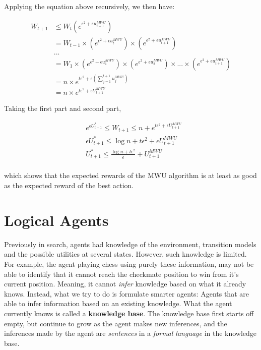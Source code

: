 \documentclass[12pt]{article}
\begin{document}
Applying the equation above recursively, we then have:

\begin{equation*}
\begin{aligned}
W_{t+1} &\leq W_t (e^{\epsilon^2 + \epsilon u^{MWU}_{t+1}})\\
&= W_{t -1} \times (e^{\epsilon^2 + \epsilon u^{MWU}_{t}}) \times (e^{\epsilon^2 + \epsilon u^{MWU}_{t+1}})\\
& ...\\
&= W_1 \times  (e^{\epsilon^2 + \epsilon u^{MWU}_{1}}) \times  (e^{\epsilon^2 + \epsilon u^{MWU}_{2}}) \times ... \times (e^{\epsilon^2 + \epsilon u^{MWU}_{t+1}})\\
&= n \times e^{t\epsilon^2 + \epsilon(\sum^{t+1}_{j=1} u^{MWU}_{j})} \\
&= n \times e^{t\epsilon^2 + \epsilon U^{MWU}_{t+1}} 
\end{aligned}
\end{equation*}

Taking the first part and second part,

\begin{equation*}
\begin{aligned}
& e^{\epsilon U^*_{t+1}} \leq W_{t+1} \leq n + e^{t\epsilon^2 + \epsilon U^{MWU}_{t+1}}\\
& \epsilon U^*_{t+1} \leq \log n +  t\epsilon^2 + \epsilon U^{MWU}_{t+1} \\
& U^*_{t+1} \leq \frac{\log n +  t\epsilon^2}{\epsilon} + U^{MWU}_{t+1} \\
\end{aligned}
\end{equation*}

which shows that the expected rewards of the MWU algorithm is at least as good as the expected reward of the best action.

\section{Logical Agents}

Previously in search, agents had knowledge of the environment, transition models and the possible utilities at several states. However, such knowledge is limited. For example, the agent playing chess using purely these information, may not be able to identify that it cannot reach the checkmate position to win from it's current position. Meaning, it cannot \textit{infer} knowledge based on what it already knows. Instead, what we try to do is formulate smarter agents: Agents that are able to infer information based on an existing knowledge. What the agent currently knows is called a \textbf{knowledge base}. The knowledge base first starts off empty, but continue to grow as the agent makes new inferences, and the inferences made by the agent are \textit{sentences} in a \textit{formal language} in the knowledge base.\\
\end{document}
